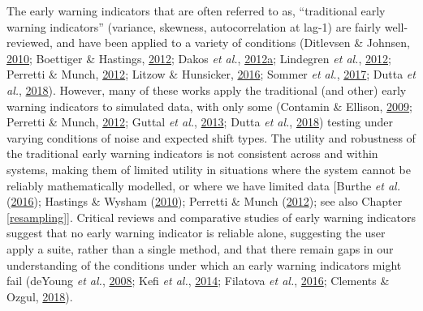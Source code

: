 \documentclass[print]{nuthesis}
\begin{document}
The early warning indicators that are often referred to as, ``traditional early warning indicators'' (variance, skewness, autocorrelation at lag-1) are fairly well-reviewed, and have been applied to a variety of conditions (Ditlevsen \& Johnsen, \protect\hyperlink{ref-ditlevsen2010tipping}{2010}; Boettiger \& Hastings, \protect\hyperlink{ref-boettiger_quantifying_2012}{2012}; Dakos \emph{et al.}, \protect\hyperlink{ref-dakos2012methods}{2012}\protect\hyperlink{ref-dakos2012methods}{a}; Lindegren \emph{et al.}, \protect\hyperlink{ref-lindegren_early_2012}{2012}; Perretti \& Munch, \protect\hyperlink{ref-perretti2012regime}{2012}; Litzow \& Hunsicker, \protect\hyperlink{ref-litzow_early_2016}{2016}; Sommer \emph{et al.}, \protect\hyperlink{ref-sommer2017generic}{2017}; Dutta \emph{et al.}, \protect\hyperlink{ref-dutta2018robustness}{2018}). However, many of these works apply the traditional (and other) early warning indicators to simulated data, with only some (Contamin \& Ellison, \protect\hyperlink{ref-contamin_indicators_2009}{2009}; Perretti \& Munch, \protect\hyperlink{ref-perretti2012regime}{2012}; Guttal \emph{et al.}, \protect\hyperlink{ref-guttal2013robustness}{2013}; Dutta \emph{et al.}, \protect\hyperlink{ref-dutta2018robustness}{2018}) testing under varying conditions of noise and expected shift types. The utility and robustness of the traditional early warning indicators is not consistent across and within systems, making them of limited utility in situations where the system cannot be reliably mathematically modelled, or where we have limited data {[}Burthe \emph{et al.} (\protect\hyperlink{ref-burthe2016early}{2016}); Hastings \& Wysham (\protect\hyperlink{ref-hastings2010regime}{2010}); Perretti \& Munch (\protect\hyperlink{ref-perretti2012regime}{2012}); see also Chapter \ref{resampling}{]}. Critical reviews and comparative studies of early warning indicators suggest that no early warning indicator is reliable alone, suggesting the user apply a suite, rather than a single method, and that there remain gaps in our understanding of the conditions under which an early warning indicators might fail (deYoung \emph{et al.}, \protect\hyperlink{ref-deyoung_regime_2008}{2008}; Kefi \emph{et al.}, \protect\hyperlink{ref-kefi2014early}{2014}; Filatova \emph{et al.}, \protect\hyperlink{ref-filatova2016regime}{2016}; Clements \& Ozgul, \protect\hyperlink{ref-clements2018indicators}{2018}).
\end{document}
